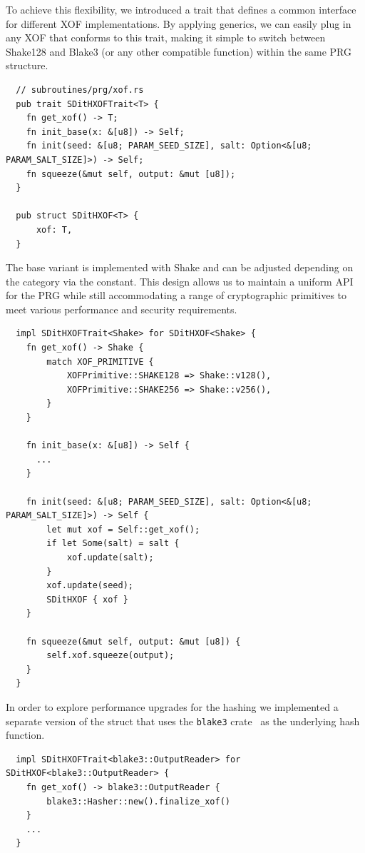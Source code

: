 \documentclass[11pt]{report}
\theoremstyle{definition}
\theoremstyle{plain}
\begin{document}
To achieve this flexibility, we introduced a trait that defines a common interface for different XOF implementations. By applying generics, we can easily plug in any XOF that conforms to this trait, making it simple to switch between Shake128 and Blake3 (or any other compatible function) within the same PRG structure.

\begin{verbatim}
  // subroutines/prg/xof.rs
  pub trait SDitHXOFTrait<T> {
    fn get_xof() -> T;
    fn init_base(x: &[u8]) -> Self;
    fn init(seed: &[u8; PARAM_SEED_SIZE], salt: Option<&[u8; PARAM_SALT_SIZE]>) -> Self;
    fn squeeze(&mut self, output: &mut [u8]);
  }

  pub struct SDitHXOF<T> {
      xof: T,
  }
\end{verbatim}

The base variant is implemented with Shake and can be adjusted depending on the category via the  constant. This design allows us to maintain a uniform API for the PRG while still accommodating a range of cryptographic primitives to meet various performance and security requirements.

\begin{verbatim}
  impl SDitHXOFTrait<Shake> for SDitHXOF<Shake> {
    fn get_xof() -> Shake {
        match XOF_PRIMITIVE {
            XOFPrimitive::SHAKE128 => Shake::v128(),
            XOFPrimitive::SHAKE256 => Shake::v256(),
        }
    }

    fn init_base(x: &[u8]) -> Self {
      ...
    }

    fn init(seed: &[u8; PARAM_SEED_SIZE], salt: Option<&[u8; PARAM_SALT_SIZE]>) -> Self {
        let mut xof = Self::get_xof();
        if let Some(salt) = salt {
            xof.update(salt);
        }
        xof.update(seed);
        SDitHXOF { xof }
    }

    fn squeeze(&mut self, output: &mut [u8]) {
        self.xof.squeeze(output);
    }
  }
\end{verbatim}

In order to explore performance upgrades for the hashing we implemented a separate version of the  struct that uses the \texttt{blake3} crate~\cite{blakethree} as the underlying hash function.

\begin{verbatim}
  impl SDitHXOFTrait<blake3::OutputReader> for SDitHXOF<blake3::OutputReader> {
    fn get_xof() -> blake3::OutputReader {
        blake3::Hasher::new().finalize_xof()
    }
    ...
  }
\end{verbatim}
\end{document}
